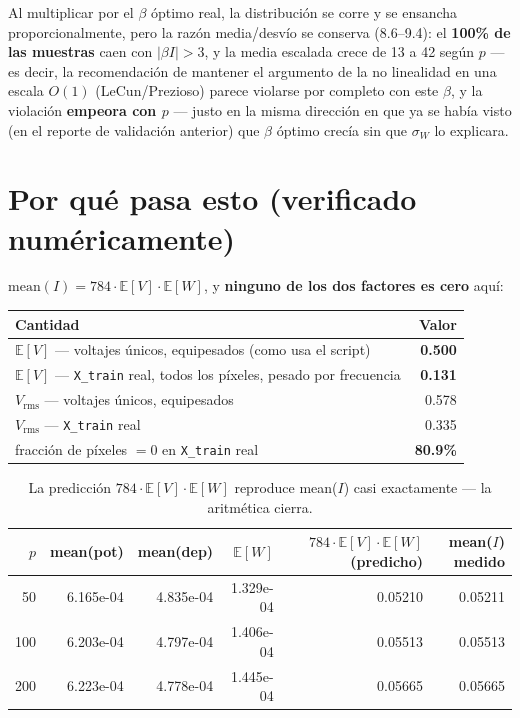 \documentclass[11pt]{article}
\begin{document}
Al multiplicar por el $\beta$ óptimo real, la distribución se corre y se
ensancha proporcionalmente, pero la razón media/desvío se conserva
(8.6--9.4): el \textbf{100\% de las muestras} caen con $|\beta I|>3$, y la
media escalada crece de 13 a 42 según $p$ --- es decir, la recomendación de
mantener el argumento de la no linealidad en una escala $O(1)$
(LeCun/Prezioso) parece violarse por completo con este $\beta$, y la
violación \textbf{empeora con $p$} --- justo en la misma dirección en que
ya se había visto (en el reporte de validación anterior) que $\beta$
óptimo crecía sin que $\sigma_W$ lo explicara.

\section{Por qué pasa esto (verificado numéricamente)}

$\mathrm{mean}(I) = 784\cdot\mathbb{E}[V]\cdot\mathbb{E}[W]$, y
\textbf{ninguno de los dos factores es cero} aquí:

\begin{table}[htbp]
\centering
\small
\begin{tabular}{@{}lr@{}}
\toprule
Cantidad & Valor \\
\midrule
$\mathbb{E}[V]$ --- voltajes únicos, equipesados (como usa el script) & \textbf{0.500} \\
$\mathbb{E}[V]$ --- \texttt{X\_train} real, todos los píxeles, pesado por frecuencia & \textbf{0.131} \\
$V_{\mathrm{rms}}$ --- voltajes únicos, equipesados & 0.578 \\
$V_{\mathrm{rms}}$ --- \texttt{X\_train} real & 0.335 \\
fracción de píxeles $=0$ en \texttt{X\_train} real & \textbf{80.9\%} \\
\bottomrule
\end{tabular}
\end{table}

\begin{table}[htbp]
\centering
\small
\begin{tabular}{@{}rrrrrr@{}}
\toprule
$p$ & mean(pot) & mean(dep) & $\mathbb{E}[W]$ & $784\cdot\mathbb{E}[V]\cdot\mathbb{E}[W]$ (predicho) & mean($I$) medido \\
\midrule
50  & 6.165e-04 & 4.835e-04 & 1.329e-04 & 0.05210 & 0.05211 \\
100 & 6.203e-04 & 4.797e-04 & 1.406e-04 & 0.05513 & 0.05513 \\
200 & 6.223e-04 & 4.778e-04 & 1.445e-04 & 0.05665 & 0.05665 \\
\bottomrule
\end{tabular}
\caption{La predicción $784\cdot\mathbb{E}[V]\cdot\mathbb{E}[W]$ reproduce
mean($I$) casi exactamente --- la aritmética cierra.}
\end{table}
\end{document}
